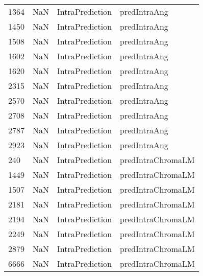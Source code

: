 \begin{tabular}{llll}
1364 &                   NaN &            IntraPrediction &                              predIntraAng \\
1450 &                   NaN &            IntraPrediction &                              predIntraAng \\
1508 &                   NaN &            IntraPrediction &                              predIntraAng \\
1602 &                   NaN &            IntraPrediction &                              predIntraAng \\
1620 &                   NaN &            IntraPrediction &                              predIntraAng \\
2315 &                   NaN &            IntraPrediction &                              predIntraAng \\
2570 &                   NaN &            IntraPrediction &                              predIntraAng \\
2708 &                   NaN &            IntraPrediction &                              predIntraAng \\
2787 &                   NaN &            IntraPrediction &                              predIntraAng \\
2923 &                   NaN &            IntraPrediction &                              predIntraAng \\
240  &                   NaN &            IntraPrediction &                         predIntraChromaLM \\
1449 &                   NaN &            IntraPrediction &                         predIntraChromaLM \\
1507 &                   NaN &            IntraPrediction &                         predIntraChromaLM \\
2181 &                   NaN &            IntraPrediction &                         predIntraChromaLM \\
2194 &                   NaN &            IntraPrediction &                         predIntraChromaLM \\
2249 &                   NaN &            IntraPrediction &                         predIntraChromaLM \\
2879 &                   NaN &            IntraPrediction &                         predIntraChromaLM \\
6666 &                   NaN &            IntraPrediction &                         predIntraChromaLM \\

\end{tabular}
